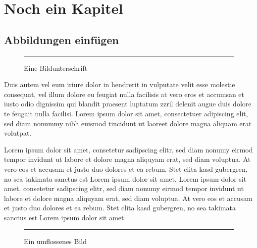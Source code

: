 
\chapter{Noch ein Kapitel}

\section{Abbildungen einfügen}\label{sec:figures}

\begin{figure}[h]
\centering
\rule{10cm}{6.2cm}
\caption{Eine Bildunterschrift}\label{fig:somepicture}
\end{figure}

Duis autem vel eum iriure dolor in hendrerit in vulputate velit esse molestie consequat, vel illum dolore eu feugiat nulla facilisis at vero eros et accumsan et iusto odio dignissim qui blandit praesent luptatum zzril delenit augue duis dolore te feugait nulla facilisi. Lorem ipsum dolor sit amet, consectetuer adipiscing elit, sed diam nonummy nibh euismod tincidunt ut laoreet dolore magna aliquam erat volutpat.   

Lorem ipsum dolor sit amet, consetetur sadipscing elitr, sed diam nonumy eirmod tempor invidunt ut labore et dolore magna aliquyam erat, sed diam voluptua. At vero eos et accusam et justo duo dolores et ea rebum. Stet clita kasd gubergren, no sea takimata sanctus est Lorem ipsum dolor sit amet. Lorem ipsum dolor sit amet, consetetur sadipscing elitr, sed diam nonumy eirmod tempor invidunt ut labore et dolore magna aliquyam erat, sed diam voluptua. At vero eos et accusam et justo duo dolores et ea rebum. Stet clita kasd gubergren, no sea takimata sanctus est Lorem ipsum dolor sit amet.

\begin{wrapfigure}{r}{0.5\textwidth}
  \begin{center}
			\rule{7cm}{7cm}
  \end{center}
  \caption{Ein umflossenes Bild}
\end{wrapfigure}

